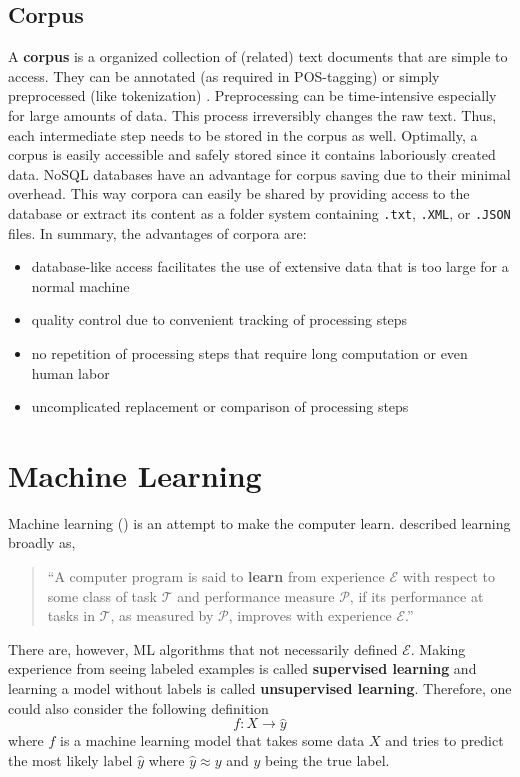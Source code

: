 \subsection{Corpus}
A \textbf{corpus} is a organized collection of (related) text documents that are simple to access. They can be annotated (as required in POS-tagging) or simply preprocessed (like tokenization) \citep{Bengfort2018}.
Preprocessing can be time-intensive especially for large amounts of data. This process irreversibly changes the raw text. Thus, each intermediate step needs to be stored in the corpus as well.
Optimally, a corpus is easily accessible and safely stored since it contains laboriously created data. NoSQL databases have an advantage for corpus saving due to their minimal overhead.
This way corpora can easily be shared by providing access to the database or extract its content as a folder system containing \texttt{.txt}, \texttt{.XML}, or \texttt{.JSON} files.
In summary, the advantages of corpora are:
\begin{itemize}
  \item database-like access facilitates the use of extensive data that is too large for a normal machine
  \item quality control due to convenient tracking of processing steps
  \item no repetition of processing steps that require long computation or even human labor
  \item uncomplicated replacement or comparison of processing steps
\end{itemize}

\section{Machine Learning}
Machine learning () is an attempt to make the computer learn. \citeauthor{Mitchell1997} described learning broadly as,
%
\begin{quote}
``A computer program is said to \textbf{learn} from experience $\mathcal{E}$ with respect to some class of task $\mathcal{T}$ and performance measure $\mathcal{P}$, if its performance at tasks in $\mathcal{T}$, as measured by $\mathcal{P}$, improves with experience $\mathcal{E}$.''
\end{quote}
%
There are, however, ML algorithms that not necessarily defined $\mathcal{E}$. Making experience from seeing labeled examples is called \textbf{supervised learning} and learning a model without labels is called \textbf{unsupervised learning}. Therefore, one could also consider the following definition  \[f: X \rightarrow \hat{y}\] where $f$ is a machine learning model that takes some data $X$ and tries to predict the most likely label $\hat{y}$ where $\hat{y} \approx y$ and $y$ being the true label.

